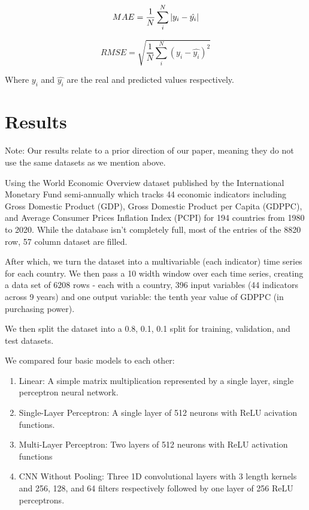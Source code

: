 \documentclass[final]{cvpr}
\begin{document}
    \begin{equation}
        MAE = \frac{1}{N}\sum_i^N|y_i - \hat{y_i}| \\
    \end{equation}

    \begin{equation}
        RMSE = \sqrt{\frac{1}{N}\sum_i^N(y_i - \hat{y_i})^2}
    \end{equation}

    Where $y_i$ and $\hat{y_i}$ are the real and predicted values respectively.

\section{Results}

    Note: Our results relate to a prior direction of our paper, meaning they do
    not use the same datasets as we mention above.
    
    Using the World Economic Overview dataset published by the International
    Monetary Fund semi-annually which tracks 44 economic indicators including
    Gross Domestic Product (GDP), Gross Domestic Product per Capita (GDPPC), and
    Average Consumer Prices Inflation Index (PCPI) for 194 countries from 1980
    to 2020. While the database isn't completely full, most of the entries of
    the 8820 row, 57 column dataset are filled.
    
    After which, we turn the dataset into a multivariable (each indicator) time
    series for each country. We then pass a 10 width window over each time
    series, creating a data set of 6208 rows - each with a country, 396 input
    variables (44 indicators across 9 years) and one output variable: the tenth
    year value of GDPPC (in purchasing power).
    
    We then split the dataset into a 0.8, 0.1, 0.1 split for training,
    validation, and test datasets.

    We compared four basic models to each other:
    \begin{enumerate}
        \item Linear: A simple matrix multiplication represented by a single
            layer, single perceptron neural network.

        \item Single-Layer Perceptron: A single layer of 512 neurons with ReLU
            acivation functions.

        \item Multi-Layer Perceptron: Two layers of 512 neurons with ReLU
            activation functions

        \item CNN Without Pooling: Three 1D convolutional layers with 3 length
            kernels and 256, 128, and 64 filters respectively followed by one
            layer of 256 ReLU perceptrons.
    \end{enumerate}
\end{document}
